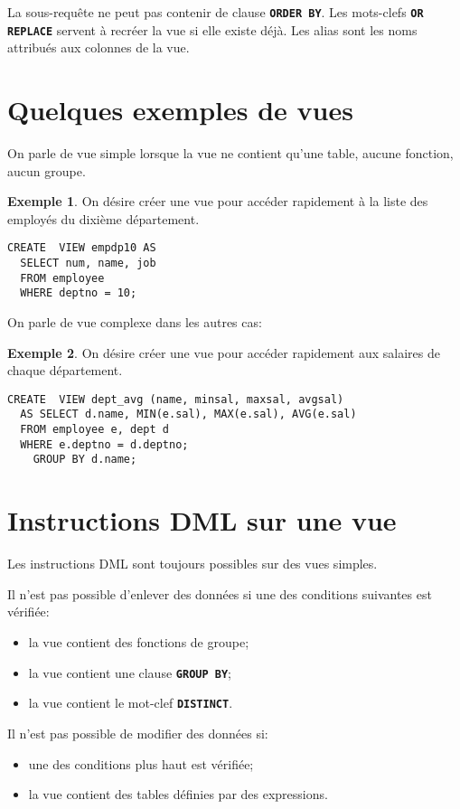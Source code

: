\documentclass[a4paper, 12pt]{report}
\newcommand{\textSQL}[1]{\texttt{\textbf{#1}}}
\theoremstyle{definition} \newtheorem{ex}{Exemple}
\begin{document}
La sous-requête ne peut pas contenir de clause \textSQL{ORDER BY}. Les mots-clefs \textSQL{OR REPLACE} servent à recréer la vue si elle existe déjà. Les alias sont les noms attribués aux colonnes de la vue.

\section{Quelques exemples de vues}
On parle de vue simple lorsque la vue ne contient qu'une table, aucune fonction, aucun groupe.
\begin{ex}
On désire créer une vue pour accéder rapidement à la liste des employés du dixième département.
\begin{lstlisting}[frame=single]
CREATE  VIEW empdp10 AS
  SELECT num, name, job
  FROM employee
  WHERE deptno = 10;
\end{lstlisting}
\end{ex}

On parle de vue complexe dans les autres cas:
\begin{ex}
On désire créer une vue pour accéder rapidement aux salaires de chaque département.
\begin{lstlisting}[frame=single]
CREATE  VIEW dept_avg (name, minsal, maxsal, avgsal)
  AS SELECT d.name, MIN(e.sal), MAX(e.sal), AVG(e.sal)
  FROM employee e, dept d
  WHERE e.deptno = d.deptno;
	GROUP BY d.name;
\end{lstlisting}
\end{ex}

\section{Instructions DML sur une vue}
Les instructions DML sont toujours possibles sur des vues simples. 

Il n'est pas possible d'enlever des données si une des conditions suivantes est vérifiée:
\begin{itemize}
  \item la vue contient des fonctions de groupe;
	\item la vue contient une clause \textSQL{GROUP BY};
	\item la vue contient le mot-clef \textSQL{DISTINCT}.
\end{itemize}

Il n'est pas possible de modifier des données si:
\begin{itemize}
\item une des conditions plus haut est vérifiée;
\item la vue contient des tables définies par des expressions.
\end{itemize}
\end{document}
